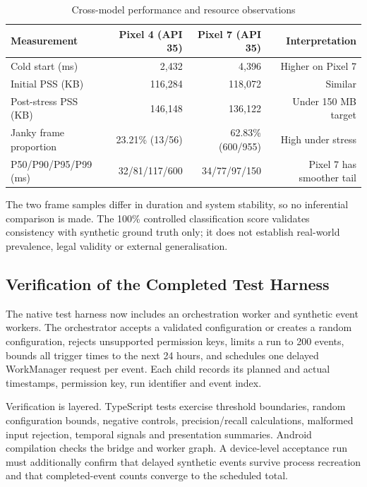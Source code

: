 \begin{table}[H]
\centering
\caption{Cross-model performance and resource observations}
\label{tab:ch5-cross-model}
\small
\begin{tabular}{lrrr}
\toprule
\textbf{Measurement} & \textbf{Pixel 4 (API 35)} & \textbf{Pixel 7 (API 35)} & \textbf{Interpretation} \\
\midrule
Cold start (ms) & 2,432 & 4,396 & Higher on Pixel 7 \\
Initial PSS (KB) & 116,284 & 118,072 & Similar \\
Post-stress PSS (KB) & 146,148 & 136,122 & Under 150 MB target \\
Janky frame proportion & 23.21\% (13/56) & 62.83\% (600/955) & High under stress \\
P50/P90/P95/P99 (ms) & 32/81/117/600 & 34/77/97/150 & Pixel 7 has smoother tail \\
\bottomrule
\end{tabular}
\end{table}

The two frame samples differ in duration and system stability, so no inferential comparison is made. The 100\% controlled classification score validates consistency with synthetic ground truth only; it does not establish real-world prevalence, legal validity or external generalisation.

\subsection{Verification of the Completed Test Harness}

The native test harness now includes an orchestration worker and synthetic event workers. The orchestrator accepts a validated configuration or creates a random configuration, rejects unsupported permission keys, limits a run to 200 events, bounds all trigger times to the next 24 hours, and schedules one delayed WorkManager request per event. Each child records its planned and actual timestamps, permission key, run identifier and event index.

Verification is layered. TypeScript tests exercise threshold boundaries, random configuration bounds, negative controls, precision/recall calculations, malformed input rejection, temporal signals and presentation summaries. Android compilation checks the bridge and worker graph. A device-level acceptance run must additionally confirm that delayed synthetic events survive process recreation and that completed-event counts converge to the scheduled total.


